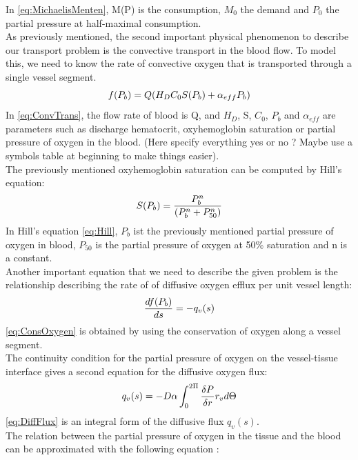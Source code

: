 %
In \ref{eq:MichaelisMenten}, M(P) is the consumption, $M_0$ the demand and $P_0$ the partial pressure at half-maximal consumption.
\\As previously mentioned, the second important physical phenomenon to describe our transport problem is the convective transport in the blood flow. To model this, we need to know the rate of convective oxygen that is transported through a single vessel segment.
\begin{equation}
\\f(P_b) = Q(H_DC_0S(P_b) + \alpha_{eff}P_b)
\label{eq:ConvTrans}
\end{equation}
%
In \ref{eq:ConvTrans}, the flow rate of blood is Q, and $H_D$, S, $C_0$, $P_b$ and $\alpha_{eff}$ are parameters such as discharge hematocrit, oxyhemoglobin saturation or partial pressure of oxygen in the blood. (Here specify everything yes or no ? Maybe use a symbols table at beginning to make things easier).
\\The previously mentioned oxyhemoglobin saturation can be computed by Hill's equation:
\begin{equation}
\\S(P_b) = \frac{P_b^n}{(P_b^n+P_{50}^n)}
\label{eq:Hill}
\end{equation}
In Hill's equation \ref{eq:Hill}, $P_b$ ist the previously mentioned partial pressure of oxygen in blood, $P_{50}$ is the partial pressure of oxygen at 50\% saturation and n is a constant.
%
\\Another important equation that we need to describe the given problem is the relationship describing the rate of of diffusive oxygen efflux per unit vessel length:
\begin{equation}
\\ \frac{df(P_b)}{ds} = -q_v(s)
\label{eq:ConsOxygen}
\end{equation}
\ref{eq:ConsOxygen} is obtained by using the conservation of oxygen along a vessel segment.
%
\\The continuity condition for the partial pressure of oxygen on the vessel-tissue interface gives a second equation for the diffusive oxygen flux:
\begin{equation}
\\q_v(s) = -D\alpha \int_{0}^{2\Pi} 
\frac{\delta P}{\delta r}r_v d \Theta
\label{eq:DiffFlux}
\end{equation}
\ref{eq:DiffFlux} is an integral form of the diffusive flux $q_v(s)$.
%
\\The relation between the partial pressure of oxygen in the tissue and the blood can be approximated with the following equation \cite{hellums1977resistance}:
